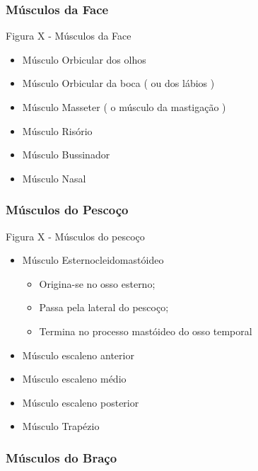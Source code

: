 \documentclass[
]{book}
\providecommand{\tightlist}{%
  \setlength{\itemsep}{0pt}\setlength{\parskip}{0pt}}
\begin{document}
\hypertarget{muxfasculos-da-face}{%
\subsubsection{Músculos da Face}\label{muxfasculos-da-face}}

Figura X - Músculos da Face

\begin{itemize}
\tightlist
\item
  Músculo Orbicular dos olhos
\item
  Músculo Orbicular da boca ( ou dos lábios )
\item
  Músculo Masseter ( o músculo da mastigação )
\item
  Músculo Risório
\item
  Músculo Bussinador
\item
  Músculo Nasal
\end{itemize}

\hypertarget{muxfasculos-do-pescouxe7o}{%
\subsubsection{Músculos do Pescoço}\label{muxfasculos-do-pescouxe7o}}

Figura X - Músculos do pescoço

\begin{itemize}
\tightlist
\item
  Músculo Esternocleidomastóideo

  \begin{itemize}
  \tightlist
  \item
    Origina-se no osso esterno;
  \item
    Passa pela lateral do pescoço;
  \item
    Termina no processo mastóideo do osso temporal
  \end{itemize}
\item
  Músculo escaleno anterior
\item
  Músculo escaleno médio
\item
  Músculo escaleno posterior
\item
  Músculo Trapézio
\end{itemize}

\hypertarget{muxfasculos-do-brauxe7o}{%
\subsubsection{Músculos do Braço}\label{muxfasculos-do-brauxe7o}}
\end{document}
